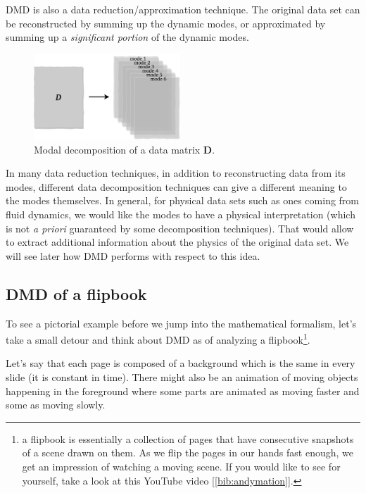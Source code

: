 \documentclass[10pt,twocolumn]{article}
\begin{document}
DMD is also a data reduction/approximation technique. The original data set can be reconstructed by summing up the dynamic modes, or approximated by summing up a \textit{significant portion} of the dynamic modes.

\begin{figure}[H]
\centering\includegraphics[width=5.5cm]{DMD-modal-decomposition.png}
\caption{Modal decomposition of a data matrix $\mathbf{D}$.}
\label{fig:modal-decomposition}
\end{figure}

In many data reduction techniques, in addition to reconstructing data from its modes, different data decomposition techniques can give a different meaning to the modes themselves. In general, for physical data sets such as ones coming from fluid dynamics, we would like the modes to have a physical interpretation (which is not \textit{a priori} guaranteed by some decomposition techniques). That would allow to extract additional information about the physics of the original data set. We will see later how DMD performs with respect to this idea. 


\subsection{DMD of a flipbook}

To see a pictorial example before we jump into the mathematical formalism, let's take a small detour and think about DMD as of analyzing a flipbook\footnote{a flipbook is essentially a collection of pages that have consecutive snapshots of a scene drawn on them. As we flip the pages in our hands fast enough, we get an impression of watching a moving scene. If you would like to see for yourself, take a look at this YouTube video [\ref{bib:andymation}].}.

Let's say that each page is composed of a background which is the same in every slide (it is constant in time). There might also be an animation of moving objects happening in the foreground where some parts are animated as moving faster and some as moving slowly.
\end{document}
